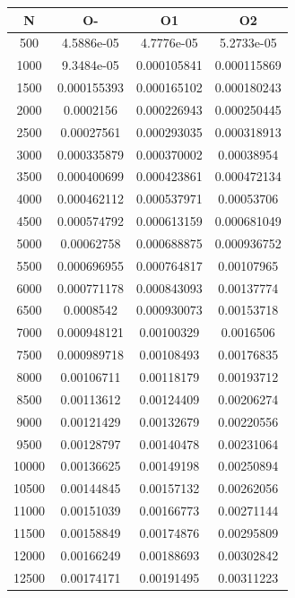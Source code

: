 \begin{center}
\begin{tabular}{| c | c | c | c |}
\hline
\textbf{N} & \textbf{O-} & \textbf{O1} & \textbf{O2} \\ \hline
500 & 4.5886e-05 & 4.7776e-05 & 5.2733e-05 \\ \hline
1000 & 9.3484e-05 & 0.000105841 & 0.000115869 \\ \hline
1500 & 0.000155393 & 0.000165102 & 0.000180243 \\ \hline
2000 & 0.0002156 & 0.000226943 & 0.000250445 \\ \hline
2500 & 0.00027561 & 0.000293035 & 0.000318913 \\ \hline
3000 & 0.000335879 & 0.000370002 & 0.00038954 \\ \hline
3500 & 0.000400699 & 0.000423861 & 0.000472134 \\ \hline
4000 & 0.000462112 & 0.000537971 & 0.00053706 \\ \hline
4500 & 0.000574792 & 0.000613159 & 0.000681049 \\ \hline
5000 & 0.00062758 & 0.000688875 & 0.000936752 \\ \hline
5500 & 0.000696955 & 0.000764817 & 0.00107965 \\ \hline
6000 & 0.000771178 & 0.000843093 & 0.00137774 \\ \hline
6500 & 0.0008542 & 0.000930073 & 0.00153718 \\ \hline
7000 & 0.000948121 & 0.00100329 & 0.0016506 \\ \hline
7500 & 0.000989718 & 0.00108493 & 0.00176835 \\ \hline
8000 & 0.00106711 & 0.00118179 & 0.00193712 \\ \hline
8500 & 0.00113612 & 0.00124409 & 0.00206274 \\ \hline
9000 & 0.00121429 & 0.00132679 & 0.00220556 \\ \hline
9500 & 0.00128797 & 0.00140478 & 0.00231064 \\ \hline
10000 & 0.00136625 & 0.00149198 & 0.00250894 \\ \hline
10500 & 0.00144845 & 0.00157132 & 0.00262056 \\ \hline
11000 & 0.00151039 & 0.00166773 & 0.00271144 \\ \hline
11500 & 0.00158849 & 0.00174876 & 0.00295809 \\ \hline
12000 & 0.00166249 & 0.00188693 & 0.00302842 \\ \hline
12500 & 0.00174171 & 0.00191495 & 0.00311223 \\ \hline
\hline
\end{tabular}
\end{center}

